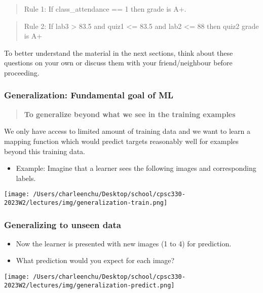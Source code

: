 \documentclass[11pt]{article}
\providecommand{\tightlist}{%
      \setlength{\itemsep}{0pt}\setlength{\parskip}{0pt}}
\begin{document}
\begin{quote}
Rule 1: If class\_attendance == 1 then grade is A+.
\end{quote}

\begin{quote}
Rule 2: If lab3 \textgreater{} 83.5 and quiz1 \textless= 83.5 and lab2
\textless= 88 then quiz2 grade is A+
\end{quote}

To better understand the material in the next sections, think about
these questions on your own or discuss them with your friend/neighbour
before proceeding.

    

    \subsubsection{Generalization: Fundamental goal of
ML}\label{generalization-fundamental-goal-of-ml}

\begin{quote}
\textbf{To generalize beyond what we see in the training examples}
\end{quote}

We only have access to limited amount of training data and we want to
learn a mapping function which would predict targets reasonably well for
examples beyond this training data.

    \begin{itemize}
\tightlist
\item
  Example: Imagine that a learner sees the following images and
  corresponding labels.
\end{itemize}

\texttt{[image: /Users/charleenchu/Desktop/school/cpsc330-2023W2/lectures/img/generalization-train.png]}

    \subsubsection{Generalizing to unseen
data}\label{generalizing-to-unseen-data}

\begin{itemize}
\tightlist
\item
  Now the learner is presented with new images (1 to 4) for prediction.
\item
  What prediction would you expect for each image?
\end{itemize}

\texttt{[image: /Users/charleenchu/Desktop/school/cpsc330-2023W2/lectures/img/generalization-predict.png]}
\end{document}
